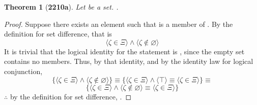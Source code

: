 \documentclass[preview]{standalone}
\newtheorem{theorem}{Theorem}
\begin{document}
\begin{theorem}[\textbf{2210a}]
    Let \bm{$\Xi$} be a set. 
    \bm{$\Xi - \varnothing = \Xi$}.
\end{theorem}
\begin{proof}
    Suppose there exists an element \bm{$\zeta$} such that \bm{$\zeta$} is a member of 
    \bm{$\Xi - \varnothing$}.
    By the definition for set difference, that is
    \begin{equation*}
        \Big \langle \zeta \in \Xi \Big \rangle
            \land 
        \Big \langle \zeta \notin \varnothing \Big \rangle
    \end{equation*}
    It is trivial that the logical identity for the statement 
    \bm{$\zeta \notin \varnothing$} is \bm{$\top$},
    since the empty set contains no members. 
    Thus, by that identity, 
    and by the identity law for logical conjunction,
    \begin{equation*}
        \Bigg\{
            \Big \langle \zeta \in \Xi \Big \rangle
                \land 
            \Big \langle \zeta \notin \varnothing \Big \rangle
        \Bigg\}
            \equiv
        \Bigg\{
            \Big \langle \zeta \in \Xi \Big \rangle
                \land 
            \Big \langle \top \Big \rangle
                \equiv
            \Big \langle \zeta \in \Xi \Big \rangle
        \Bigg\}
            \equiv
    \end{equation*}
    \begin{equation*}
        \Bigg\{
            \Big \langle \zeta \in \Xi \Big \rangle
                \land 
            \Big \langle \zeta \notin \varnothing \Big \rangle
                \equiv
            \Big \langle \zeta \in \Xi \Big \rangle
        \Bigg\}
    \end{equation*}
    $\therefore$ by the definition for set difference,
    \bm{$\Xi - \varnothing = \Xi$}.
\end{proof}
\end{document}
